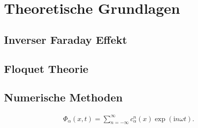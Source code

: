 \chapter{Theoretische Grundlagen}
\label{theo}
\section{Inverser Faraday Effekt}

\section{Floquet Theorie}

\section{Numerische Methoden}
\begin{align}
  \Phi_{\alpha}(x,t)=\sum_{n=-\infty}^{\infty} c_{\alpha}^n (x)
  \exp(\mathrm{i}n\omega t).
\end{align}
